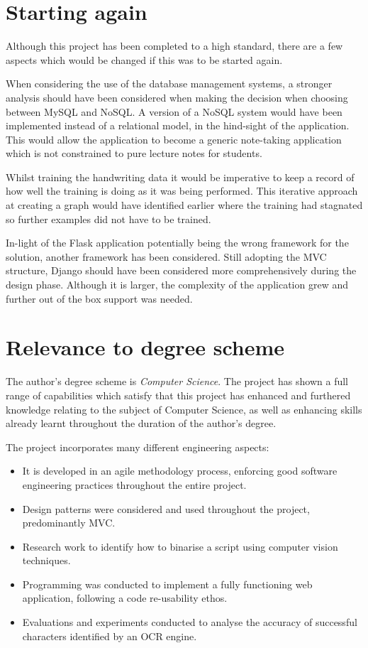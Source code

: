 \section{Starting again}
Although this project has been completed to a high standard, there are a few aspects which would be changed if this was to be started again.

When considering the use of the database management systems, a stronger analysis should have been considered when making the decision when choosing between MySQL and NoSQL. A version of a NoSQL system would have been implemented instead of a relational model, in the hind-sight of the application. This would allow the application to become a generic note-taking application which is not constrained to pure lecture notes for students.

Whilst training the handwriting data it would be imperative to keep a record of how well the training is doing as it was being performed. This iterative approach at creating a graph would have identified earlier where the training had stagnated so further examples did not have to be trained.

In-light of the Flask application potentially being the wrong framework for the solution, another framework has been considered. Still adopting the MVC structure, Django should have been considered more comprehensively during the design phase. Although it is larger, the complexity of the application grew and further out of the box support was needed.

\section{Relevance to degree scheme}
The author's degree scheme is \textit{Computer Science}. The project has shown a full range of capabilities which satisfy that this project has enhanced and furthered knowledge relating to the subject of Computer Science, as well as enhancing skills already learnt throughout the duration of the author's degree.

The project incorporates many different engineering aspects:
\begin{itemize}
	\item It is developed in an agile methodology process, enforcing good software engineering practices throughout the entire project.
	\item Design patterns were considered and used throughout the project, predominantly MVC.
	\item Research work to identify how to binarise a script using computer vision techniques.
	\item Programming was conducted to implement a fully functioning web application, following a code re-usability ethos.
	\item Evaluations and experiments conducted to analyse the accuracy of successful characters identified by an OCR engine.
\end{itemize}

